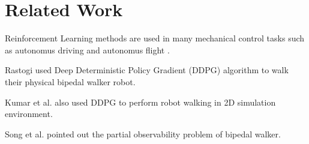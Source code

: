 \section{Related Work}
\label{sec:relatedwork}

Reinforcement Learning methods are used in many mechanical control tasks such as autonomus driving  \cite{pan_virtual_2017} \cite{shalev-shwartz_safe_2016} \cite{sallab_deep_2017} \cite{wang_deep_2019} and autonomus flight   \cite{kopsa_reinforcement_2018} \cite{abbeel_application_2006} \cite{santos_experimental_2012}.

Rastogi \cite{rastogi_deep_2017} used Deep Deterministic Policy Gradient (DDPG) algorithm to walk their physical bipedal walker robot.

Kumar et al. \cite{kumar_bipedal_2018} also used DDPG to perform robot walking in 2D simulation environment. 

Song et al. \cite{song_recurrent_2018} pointed out the partial observability problem of bipedal walker. 